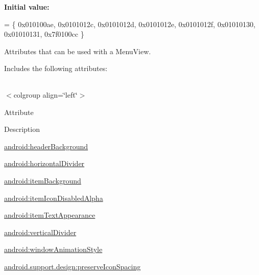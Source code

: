 {\bfseries Initial value\+:}
\begin{DoxyCode}
= \{
            0x010100ae, 0x0101012c, 0x0101012d, 0x0101012e,
            0x0101012f, 0x01010130, 0x01010131, 0x7f0100cc
        \}
\end{DoxyCode}
Attributes that can be used with a Menu\+View. 

Includes the following attributes\+:

\tabulinesep=1mm
\begin{longtabu} spread 0pt [c]{*{0}{|X[-1]}|}
\hline
\end{longtabu}
$<$colgroup align=\char`\"{}left\char`\"{}$>$ 

Attribute

Description 

{\ttfamily \hyperlink{classandroid_1_1support_1_1design_1_1R_1_1styleable_a38f013733be3380a35b5c18a342f420f}{android\+:header\+Background}}

{\ttfamily \hyperlink{classandroid_1_1support_1_1design_1_1R_1_1styleable_acd977854a2afdaf80b462337a6a55b96}{android\+:horizontal\+Divider}}

{\ttfamily \hyperlink{classandroid_1_1support_1_1design_1_1R_1_1styleable_a1ec0468c04c0d2612a6212d4448d2ad6}{android\+:item\+Background}}

{\ttfamily \hyperlink{classandroid_1_1support_1_1design_1_1R_1_1styleable_ad79c85741d32debefed2622b6ef2577f}{android\+:item\+Icon\+Disabled\+Alpha}}

{\ttfamily \hyperlink{classandroid_1_1support_1_1design_1_1R_1_1styleable_a116d9432d77aa3d62ec171b23d0bee4c}{android\+:item\+Text\+Appearance}}

{\ttfamily \hyperlink{classandroid_1_1support_1_1design_1_1R_1_1styleable_afadfabc8bd18f617b9220fe44a79d46f}{android\+:vertical\+Divider}}

{\ttfamily \hyperlink{classandroid_1_1support_1_1design_1_1R_1_1styleable_a4e2664155896bc2a2363684e68573525}{android\+:window\+Animation\+Style}}

{\ttfamily \hyperlink{classandroid_1_1support_1_1design_1_1R_1_1styleable_a95328f75cc0262ab91e2f350455b98bc}{android.\+support.\+design\+:preserve\+Icon\+Spacing}}

